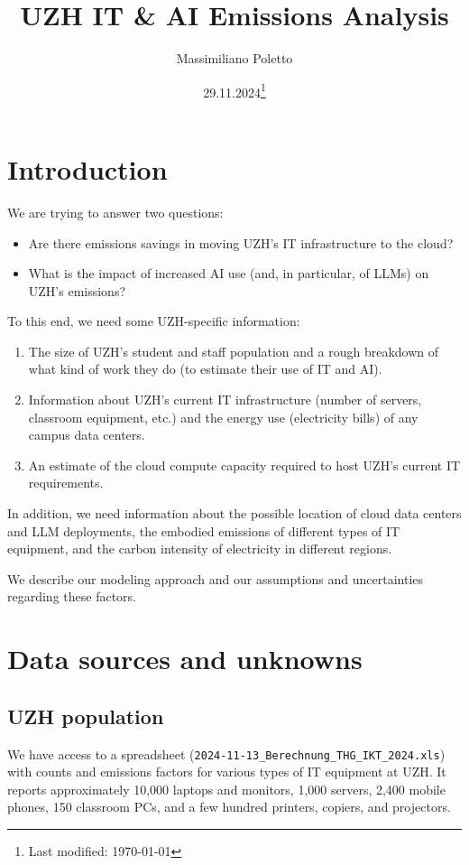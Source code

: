 \documentclass[11pt]{article}
\title{UZH IT \& AI Emissions Analysis\vspace{-1em}}
\author{Massimiliano Poletto}
\date{\vspace{-1em}29.11.2024\footnote{Last modified: \today}}
\begin{document}
\maketitle
\section{Introduction}

We are trying to answer two questions:
\begin{itemize}
    \item Are there emissions savings in moving UZH's IT infrastructure to the cloud?
    \item What is the impact of increased AI use (and, in particular, of LLMs) on UZH's emissions?
\end{itemize}

To this end, we need some UZH-specific information:
\begin{enumerate}
    \item The size of UZH's student and staff population and a rough breakdown of
        what kind of work they do (to estimate their use of IT and AI).
    \item Information about UZH's current IT infrastructure (number of servers,
        classroom equipment, etc.) and the energy use (electricity bills) of any
        campus data centers.
    \item An estimate of the cloud compute capacity required to host UZH's current IT requirements.
\end{enumerate}

In addition, we need information about the possible location of cloud data centers and
LLM deployments, the embodied emissions of different types of IT equipment, and the carbon intensity
of electricity in different regions.

We describe our modeling approach and our assumptions and uncertainties regarding these factors.

\section{Data sources and unknowns}

\subsection{UZH population}

We have access to a spreadsheet (\texttt{2024-11-13\_Berechnung\_THG\_IKT\_2024.xls}) with
counts and emissions factors for various types of IT equipment at UZH. It reports approximately
10,000 laptops and monitors, 1,000 servers, 2,400 mobile phones,  150 classroom PCs, and a few
hundred printers, copiers, and projectors.
\end{document}
